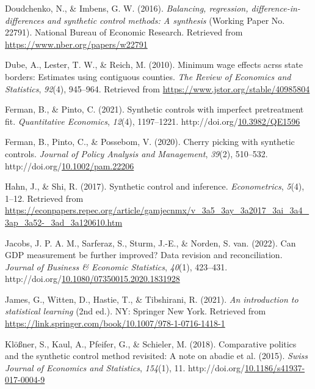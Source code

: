 \documentclass[12pt,nobind, a4paper]{reedthesis}
\newlength{\cslhangindent}
\newenvironment{CSLReferences}[2] %
{%
	\setlength{\parindent}{0pt}
	\ifodd #1 \everypar{\setlength{\hangindent}{\cslhangindent}}\ignorespaces\fi
	\ifnum #2 > 0
	\setlength{\parskip}{#2\baselineskip}
	\fi
}%
{}
\begin{document}
\begin{CSLReferences}{1}{0}
 \leavevmode{}%
 Doudchenko, N., \& Imbens, G. W. (2016). \emph{Balancing, regression, difference-in-differences and synthetic control methods: A synthesis} (Working Paper No. 22791). National Bureau of Economic Research. Retrieved from \url{https://www.nber.org/papers/w22791}

 \leavevmode{}%
 Dube, A., Lester, T. W., \& Reich, M. (2010). Minimum wage effects acrss state borders: Estimates using contiguous counties. \emph{The Review of Economics and Statistics}, \emph{92}(4), 945--964. Retrieved from \url{https://www.jstor.org/stable/40985804}

 \leavevmode{}%
 Ferman, B., \& Pinto, C. (2021). Synthetic controls with imperfect pretreatment fit. \emph{Quantitative Economics}, \emph{12}(4), 1197--1221. http://doi.org/\href{https://doi.org/10.3982/QE1596}{10.3982/QE1596}

 \leavevmode{}%
 Ferman, B., Pinto, C., \& Possebom, V. (2020). Cherry picking with synthetic controls. \emph{Journal of Policy Analysis and Management}, \emph{39}(2), 510--532. http://doi.org/\href{https://doi.org/10.1002/pam.22206}{10.1002/pam.22206}

 \leavevmode{}%
 Hahn, J., \& Shi, R. (2017). Synthetic control and inference. \emph{Econometrics}, \emph{5}(4), 1--12. Retrieved from \url{https://econpapers.repec.org/article/gamjecnmx/v_3a5_3ay_3a2017_3ai_3a4_3ap_3a52-_3ad_3a120610.htm}

 \leavevmode{}%
 Jacobs, J. P. A. M., Sarferaz, S., Sturm, J.-E., \& Norden, S. van. (2022). Can {GDP} measurement be further improved? Data revision and reconciliation. \emph{Journal of Business \& Economic Statistics}, \emph{40}(1), 423--431. http://doi.org/\href{https://doi.org/10.1080/07350015.2020.1831928}{10.1080/07350015.2020.1831928}

 \leavevmode{}%
 James, G., Witten, D., Hastie, T., \& Tibshirani, R. (2021). \emph{An introduction to statistical learning} (2nd ed.). {NY}: Springer New York. Retrieved from \url{https://link.springer.com/book/10.1007/978-1-0716-1418-1}

 \leavevmode{}%
 Klößner, S., Kaul, A., Pfeifer, G., \& Schieler, M. (2018). Comparative politics and the synthetic control method revisited: A note on abadie et al. (2015). \emph{Swiss Journal of Economics and Statistics}, \emph{154}(1), 11. http://doi.org/\href{https://doi.org/10.1186/s41937-017-0004-9}{10.1186/s41937-017-0004-9}


\end{CSLReferences}
\end{document}
